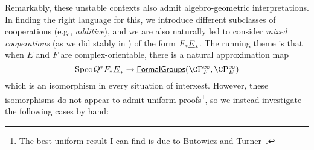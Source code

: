 Remarkably, these unstable contexts also admit algebro-geometric interpretations.  In finding the right language for this, we introduce different subclasses of cooperations (e.g., \textit{additive}), and we are also naturally led to consider \textit{mixed cooperations} (as we did stably in ) of the form $F_* \underline{\smash{E}}_{*}$.  The running theme is that when $E$ and $F$ are complex-orientable, there is a natural approximation map \[\Spec Q^* F_* \OS{E}{*} \to \InternalHom{FormalGroups}(\CP^\infty_F, \CP^\infty_E)\] which is an isomorphism in every situation of interxest.  However, these isomorphisms do not appear to admit uniform proofs\footnote{The best uniform result I can find is due to Butowiez and Turner~\cite[Theorem 3.12]{ButowiezTurner}.}, so we instead investigate the following cases by hand:
